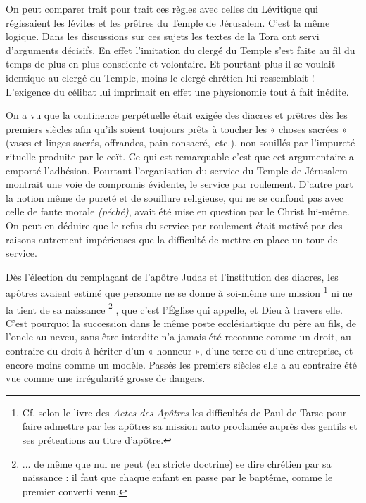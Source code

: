  On peut comparer trait pour trait ces règles avec celles du Lévitique qui régissaient les lévites et les prêtres du Temple de Jérusalem. C'est la même logique. Dans les discussions sur ces sujets les textes de la Tora ont servi d'arguments décisifs. En effet l'imitation du clergé du Temple s'est faite au fil du temps de plus en plus consciente et volontaire. Et pourtant plus il se voulait identique au clergé du Temple, moins le clergé chrétien lui ressemblait ! L'exigence du célibat lui imprimait en effet une physionomie tout à fait inédite. 

 On a vu que la continence perpétuelle était exigée des diacres et prêtres dès les premiers siècles afin qu'ils soient toujours prêts à toucher les « choses sacrées » (vases et linges sacrés, offrandes, pain consacré,~etc.), non souillés par l'impureté rituelle produite par le coït. Ce qui est remarquable c'est que cet argumentaire a emporté l'adhésion. Pourtant l'organisation du service du Temple de Jérusalem montrait une voie de compromis évidente, le service par roulement. D'autre part la notion même de pureté et de souillure religieuse, qui ne se confond pas avec celle de faute morale \emph{(péché)}, avait été mise en question par le Christ lui-même. On peut en déduire que le refus du service par roulement était motivé par des raisons autrement impérieuses que la difficulté de mettre en place un tour de service. 

 Dès l'élection du remplaçant de l'apôtre Judas et l'institution des diacres, les apôtres avaient estimé que personne ne se donne à soi-même une mission%
\footnote{Cf. selon le livre des \emph{Actes des Apôtres} les difficultés de Paul de Tarse pour faire admettre par les apôtres sa mission auto proclamée auprès des gentils et ses prétentions au titre d'apôtre.} 
ni ne la tient de sa naissance%
\footnote{... de même que nul ne peut (en stricte doctrine) se dire chrétien par sa naissance : il faut que chaque enfant en passe par le baptême, comme le premier converti venu.}%
, que c'est l'Église qui appelle, et Dieu à travers elle. C'est pourquoi la succession dans le même poste ecclésiastique du père au fils, de l'oncle au neveu, sans être interdite n'a jamais été reconnue comme un droit, au contraire du droit à hériter d'un « honneur », d'une terre ou d'une entreprise, et encore moins comme un modèle. Passés les premiers siècles elle a au contraire été vue comme une irrégularité grosse de dangers. 

